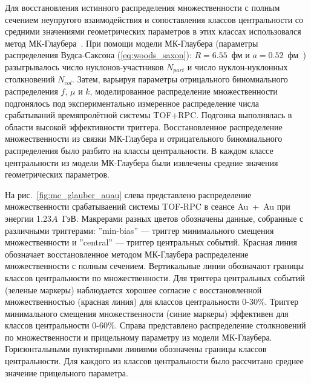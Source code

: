 Для восстановления истинного распределения множественности с полным сечением неупругого взаимодействия и сопоставления классов центральности со средними значениями геометрических параметров в этих классах использовался метод МК-Глаубера~\cite{HADES:2017def}.
При помощи модели МК-Глаубера (параметры распределения Вудса-Саксона (\ref{eq:woods_saxon}): $R=6.55$~фм и $a=0.52$~фм~\cite{LandoltBornstein2004:sm_lbs_978-3-540-45555-4_81}) разыгрывалось число нуклонов-участников $N_{part}$ и число нуклон-нуклонных столкновений $N_{col}$.
Затем, варьируя параметры отрицального биномиального распределения $f$, $\mu$ и $k$, моделированное распределение множественности подгонялось под экспериментально измеренное распределение числа срабатываний времяпролётной системы TOF+RPC.
Подгонка выполнялась в области высокой эффективности триггера.
Восстановленное распределение множественности из связки МК-Глаубера и отрицательного биномиального распределения было разбито на классы центральности.
В каждом классе центральности из модели МК-Глаубера были извлечены средние значения геометрических параметров.

На рис.~\ref{fig:mc_glauber_auau} слева представлено распределение множественности срабатываений системы TOF-RPC в сеансе Au~+~Au при энергии 1.23$A$~ГэВ. 
Макрерами разных цветов обозначены данные, собранные с различными триггерами: ''min-bias'' --- триггер минимального смещения множественности и ''central'' --- триггер центральных событий.
Красная линия обозначает восстановленное методом МК-Глаубера распределение множественности с полным сечением.
Вертикальные линии обозначают границы классов центральности по множественности.
Для триггера центральных событий (зеленые маркеры) наблюдается хорошее согласие с восстановленной множественностью (красная линия) для классов центральности 0-30\%.
Триггер минимального смещения множественности (синие маркеры) эффективен для классов центральности 0-60\%.
Справа представлено распределение столкновений по множественности и прицельному параметру из модели МК-Глаубера. 
Горизонтальными пунктирными линиями обозначены границы классов центральности.
Для каждого из классов центральности было рассчитано среднее значение прицельного параметра.

